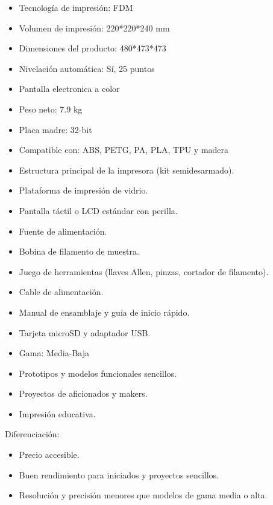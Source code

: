 \documentclass[compacto,5pt,comentarios]{aleph-notas}
\begin{document}
\begin{car}
\begin{itemize}
    \item Tecnología de impresión: FDM
    \item Volumen de impresión: 220*220*240 mm
    \item Dimensiones del producto: 480*473*473
    \item Nivelación automática: Sí, 25 puntos
    \item Pantalla electronica a color
    \item Peso neto: 7.9 kg
    \item Placa madre: 32-bit
    \item Compatible con: ABS, PETG, PA, PLA, TPU y madera
\end{itemize}
\end{car}
\begin{cont}
\begin{itemize}
    \item Estructura principal de la impresora (kit semidesarmado).
    \item Plataforma de impresión de vidrio.
    \item Pantalla táctil o LCD estándar con perilla.
    \item Fuente de alimentación.
    \item Bobina de filamento de muestra.
    \item Juego de herramientas (llaves Allen, pinzas, cortador de filamento).
    \item Cable de alimentación.
    \item Manual de ensamblaje y guía de inicio rápido.
    \item Tarjeta microSD y adaptador USB.
\end{itemize}
\end{cont}
\begin{aplic}
\begin{itemize}
    \item Gama: Media-Baja
    \item Prototipos y modelos funcionales sencillos.
    \item Proyectos de aficionados y makers.
    \item Impresión educativa.
\end{itemize}
Diferenciación:
\begin{itemize}
    \item Precio accesible.
    \item Buen rendimiento para iniciados y proyectos sencillos.
    \item Resolución y precisión menores que modelos de gama media o alta.
\end{itemize}



\end{aplic}
\end{document}
